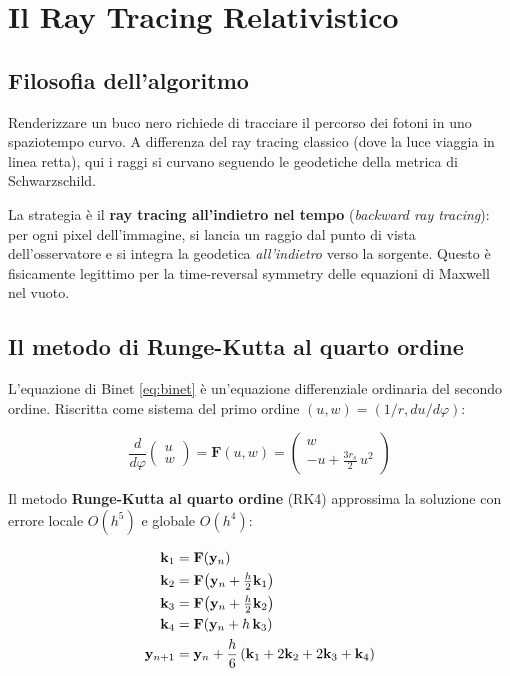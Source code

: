 \documentclass[12pt, a4paper, twoside]{article}
\newenvironment{physbox}[1]{%
  \begin{tcolorbox}[equationbox, title={#1}]
}{%
  \end{tcolorbox}
}
\theoremstyle{definition}
\newcommand{\RS}{r_{\!s}}          %
\begin{document}
\section{Il Ray Tracing Relativistico}

\subsection{Filosofia dell'algoritmo}

Renderizzare un buco nero richiede di tracciare il percorso dei fotoni in uno
spaziotempo curvo. A differenza del ray tracing classico (dove la luce viaggia
in linea retta), qui i raggi si curvano seguendo le geodetiche della metrica
di Schwarzschild.

La strategia è il \textbf{ray tracing all'indietro nel tempo} (\emph{backward
ray tracing}): per ogni pixel dell'immagine, si lancia un raggio dal punto
di vista dell'osservatore e si integra la geodetica \emph{all'indietro} verso
la sorgente. Questo è fisicamente legittimo per la time-reversal symmetry
delle equazioni di Maxwell nel vuoto.

\subsection{Il metodo di Runge-Kutta al quarto ordine}

L'equazione di Binet \eqref{eq:binet} è un'equazione differenziale ordinaria
del secondo ordine. Riscritta come sistema del primo ordine
$(u, w) = (1/r, du/d\varphi)$:

\begin{equation}
  \frac{d}{d\varphi}\begin{pmatrix}u \\ w\end{pmatrix}
  = \mathbf{F}(u, w)
  = \begin{pmatrix} w \\ -u + \tfrac{3\RS}{2}\,u^2 \end{pmatrix}
\end{equation}

Il metodo \textbf{Runge-Kutta al quarto ordine} (RK4) approssima la soluzione
con errore locale $O(h^5)$ e globale $O(h^4)$:

\begin{physbox}{Schema Runge-Kutta 4 (RK4)}
\begin{align}
  \mathbf{k}_1 &= \mathbf{F}(\mathbf{y}_n) \notag\\
  \mathbf{k}_2 &= \mathbf{F}\!\left(\mathbf{y}_n + \tfrac{h}{2}\mathbf{k}_1\right) \notag\\
  \mathbf{k}_3 &= \mathbf{F}\!\left(\mathbf{y}_n + \tfrac{h}{2}\mathbf{k}_2\right) \notag\\
  \mathbf{k}_4 &= \mathbf{F}\!\left(\mathbf{y}_n + h\,\mathbf{k}_3\right) \notag\\
  \mathbf{y}_{n+1} &= \mathbf{y}_n
    + \frac{h}{6}\left(\mathbf{k}_1 + 2\mathbf{k}_2 + 2\mathbf{k}_3 + \mathbf{k}_4\right)
  \label{eq:rk4}
\end{align}
\end{physbox}
\end{document}
